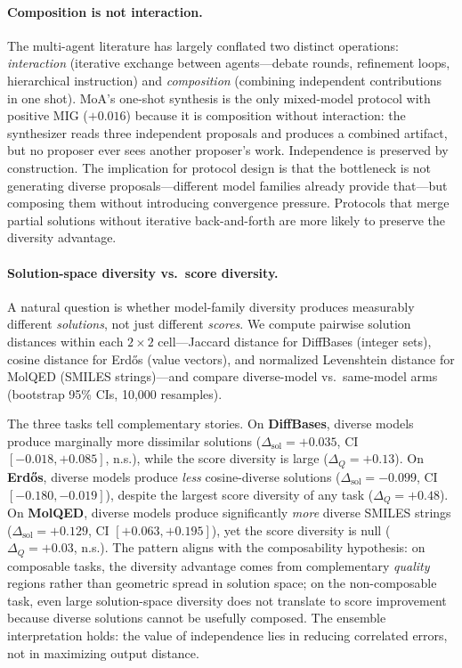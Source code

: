 \documentclass{article}
\begin{document}
\paragraph{Composition is not interaction.}
The multi-agent literature has largely conflated two distinct operations: \emph{interaction} (iterative exchange between agents---debate rounds, refinement loops, hierarchical instruction) and \emph{composition} (combining independent contributions in one shot). MoA's one-shot synthesis is the only mixed-model protocol with positive MIG ($+0.016$) because it is composition without interaction: the synthesizer reads three independent proposals and produces a combined artifact, but no proposer ever sees another proposer's work. Independence is preserved by construction. The implication for protocol design is that the bottleneck is not generating diverse proposals---different model families already provide that---but composing them without introducing convergence pressure. Protocols that merge partial solutions without iterative back-and-forth are more likely to preserve the diversity advantage.

\paragraph{Solution-space diversity vs.\ score diversity.}
A natural question is whether model-family diversity produces measurably different \emph{solutions}, not just different \emph{scores}. We compute pairwise solution distances within each $2{\times}2$ cell---Jaccard distance for DiffBases (integer sets), cosine distance for Erd\H{o}s (value vectors), and normalized Levenshtein distance for MolQED (SMILES strings)---and compare diverse-model vs.\ same-model arms (bootstrap 95\% CIs, 10{,}000 resamples).

The three tasks tell complementary stories. On \textbf{DiffBases}, diverse models produce marginally more dissimilar solutions ($\Delta_{\mathrm{sol}}{=}{+}0.035$, CI $[-0.018, +0.085]$, n.s.), while the score diversity is large ($\Delta_Q{=}{+}0.13$). On \textbf{Erd\H{o}s}, diverse models produce \emph{less} cosine-diverse solutions ($\Delta_{\mathrm{sol}}{=}{-}0.099$, CI $[-0.180, -0.019]$), despite the largest score diversity of any task ($\Delta_Q{=}{+}0.48$). On \textbf{MolQED}, diverse models produce significantly \emph{more} diverse SMILES strings ($\Delta_{\mathrm{sol}}{=}{+}0.129$, CI $[+0.063, +0.195]$), yet the score diversity is null ($\Delta_Q{=}{+}0.03$, n.s.). The pattern aligns with the composability hypothesis: on composable tasks, the diversity advantage comes from complementary \emph{quality} regions rather than geometric spread in solution space; on the non-composable task, even large solution-space diversity does not translate to score improvement because diverse solutions cannot be usefully composed. The ensemble interpretation holds: the value of independence lies in reducing correlated errors, not in maximizing output distance.
\end{document}
